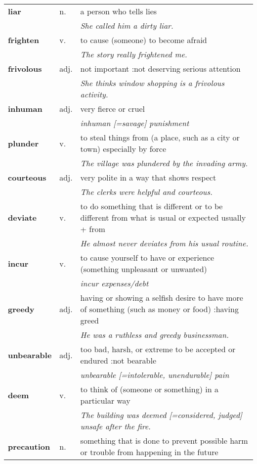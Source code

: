 \documentclass[a4paper]{article}
\begin{document}
\begin{longtable}{llp{11cm}}
\textbf{liar} & n. &  a person who tells lies \\
 & & \textit{She called him a dirty liar.}\\[0.08cm]
\textbf{frighten} & v. &  to cause (someone) to become afraid \\
 & & \textit{The story really frightened me.}\\[0.08cm]
\textbf{frivolous} & adj. &  not important :not deserving serious attention \\
 & & \textit{She thinks window shopping is a frivolous activity.}\\[0.08cm]
\textbf{inhuman} & adj. &  very fierce or cruel \\
 & & \textit{inhuman [=savage] punishment}\\[0.08cm]
\textbf{plunder} & v. &  to steal things from (a place, such as a city or town) especially by force \\
 & & \textit{The village was plundered by the invading army.}\\[0.08cm]
\textbf{courteous} & adj. &  very polite in a way that shows respect \\
 & & \textit{The clerks were helpful and courteous.}\\[0.08cm]
\textbf{deviate} & v. &  to do something that is different or to be different from what is usual or expected usually + from \\
 & & \textit{He almost never deviates from his usual routine.}\\[0.08cm]
\textbf{incur} & v. &  to cause yourself to have or experience (something unpleasant or unwanted) \\
 & & \textit{incur expenses/debt}\\[0.08cm]
\textbf{greedy} & adj. &  having or showing a selfish desire to have more of something (such as money or food) :having greed \\
 & & \textit{He was a ruthless and greedy businessman.}\\[0.08cm]
\textbf{unbearable} & adj. &  too bad, harsh, or extreme to be accepted or endured :not bearable \\
 & & \textit{unbearable [=intolerable, unendurable] pain}\\[0.08cm]
\textbf{deem} & v. &  to think of (someone or something) in a particular way \\
 & & \textit{The building was deemed [=considered, judged] unsafe after the fire.}\\[0.08cm]
\textbf{precaution} & n. &  something that is done to prevent possible harm or trouble from happening in the future \\

\end{longtable}
\end{document}
